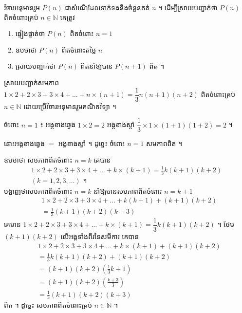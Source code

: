 \begin{theorem}
វិចារអនុមានរួម $P(n)$ ជាសំណើដែលទាក់ទងនឹងចំនួនគត់ $n$ ។ ដើម្បីស្រាយបញ្ជាក់ថា $P(n)$ ពិតចំពោះគ្រប់ $n \in \mathbb{N}$ គេត្រូវ
\begin{enumerate}[1]
  \item ផ្ទៀងផ្ទាត់ថា $P(n)$ ពិតចំពោះ $n = 1$
  \item ឧបមាថា $P(n)$ ពិតចំពោះតម្លៃ $n$
  \item ស្រាយបញ្ជាក់ថា $P(n)$ ពិតនាំឱ្យបាន $P(n+1)$ ពិត ។
\end{enumerate}
\end{theorem}

\begin{example}[លំហាត់គំរូ ១]
ស្រាយបញ្ជាក់សមភាព $1 \times 2 + 2 \times 3 + 3 \times 4 + \ldots + n \times (n + 1) = \dfrac{1}{3}n(n + 1)(n + 2)$ ពិតចំពោះគ្រប់ $n \in \mathbb{N}$ ដោយប្រើវិចារអនុមានរួមគណិតវិទ្យា ។
\end{example}
\ans
ចំពោះ $n = 1$ ៖ អង្គខាងឆ្វេង $1 \times 2 = 2$ \quad អង្គខាងស្តាំ $\dfrac{1}{3} \times 1 \times (1 + 1)(1 + 2) = 2$ ។

នោះអង្គខាងឆ្វេង $=$ អង្គខាងស្តាំ ។ ដូច្នេះ ចំពោះ $n = 1$ សមភាពពិត ។

ឧបមាថា សមភាពពិតចំពោះ $n = k$ គេបាន
\[
\begin{gathered}
1 \times 2 + 2 \times 3 + 3 \times 4 + \ldots + k \times (k + 1) = \frac{1}{3}k(k + 1)(k + 2)\\
(k = 1, 2, 3, \ldots) \text{ ។}
\end{gathered}
\]
បង្ហាញថាសមភាពពិតចំពោះ $n = k$ នាំឱ្យបានសមភាពពិតចំពោះ $n = k + 1$
\[
\begin{aligned}
&1 \times 2 + 2 \times 3 + 3 \times 4 + \ldots + k(k + 1) + (k + 1)(k + 2)\\
&= \frac{1}{3}(k + 1)(k + 2)(k + 3)
\end{aligned}
\]
គេមាន $1 \times 2 + 2 \times 3 + 3 \times 4 + \ldots + k \times (k + 1) = \dfrac{1}{3}k(k + 1)(k + 2)$ ។ ថែម $(k + 1)(k + 2)$ លើអង្គទាំងពីរនៃសមីការ គេបាន
\[
\begin{aligned}
&1 \times 2 + 2 \times 3 + 3 \times 4 + \ldots + k \times (k + 1) + (k + 1)(k + 2)\\
&= \frac{1}{3}k(k + 1)(k + 2) + (k + 1)(k + 2)\\
&= (k + 1)(k + 2)\left(\frac{1}{3}k + 1\right)\\
&= (k + 1)(k + 2)\left(\frac{k + 3}{3}\right)\\
&= \frac{1}{3}(k + 1)(k + 2)(k + 3)
\end{aligned}
\]
ពិត ។ ដូច្នេះ សមភាពពិតចំពោះគ្រប់ $n \in \mathbb{N}$ ។

